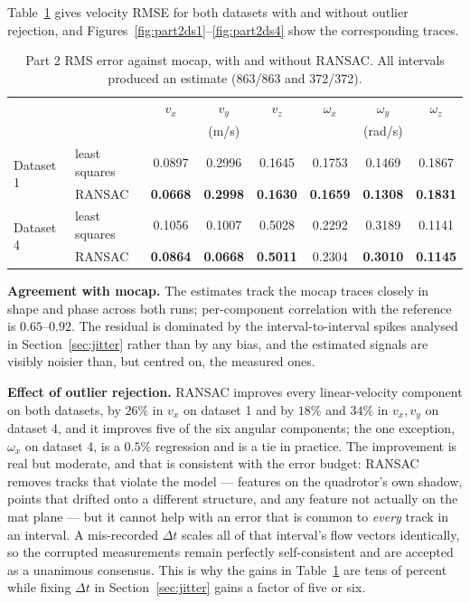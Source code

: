 \documentclass[10pt]{article}
\begin{document}
Table~\ref{tab:vel} gives velocity RMSE for both datasets with and without outlier rejection, and
Figures~\ref{fig:part2ds1}--\ref{fig:part2ds4} show the corresponding traces.

\begin{table}[htbp]
\centering\small
\caption{Part 2 RMS error against mocap, with and without RANSAC. All intervals produced an
estimate (863/863 and 372/372).}
\label{tab:vel}
\begin{tabular}{llcccccc}
\toprule
& & $v_x$ & $v_y$ & $v_z$ & $\omega_x$ & $\omega_y$ & $\omega_z$ \\
& & \multicolumn{3}{c}{(m/s)} & \multicolumn{3}{c}{(rad/s)} \\
\midrule
\multirow{2}{*}{Dataset 1} & least squares & 0.0897 & 0.2996 & 0.1645 & 0.1753 & 0.1469 & 0.1867 \\
 & RANSAC & \textbf{0.0668} & \textbf{0.2998} & \textbf{0.1630} & \textbf{0.1659} & \textbf{0.1308} & \textbf{0.1831} \\
\midrule
\multirow{2}{*}{Dataset 4} & least squares & 0.1056 & 0.1007 & 0.5028 & 0.2292 & 0.3189 & 0.1141 \\
 & RANSAC & \textbf{0.0864} & \textbf{0.0668} & \textbf{0.5011} & 0.2304 & \textbf{0.3010} & \textbf{0.1145} \\
\bottomrule
\end{tabular}
\end{table}

\textbf{Agreement with mocap.} The estimates track the mocap traces closely in shape and phase
across both runs; per-component correlation with the reference is $0.65$--$0.92$. The residual is
dominated by the interval-to-interval spikes analysed in Section~\ref{sec:jitter} rather than by any
bias, and the estimated signals are visibly noisier than, but centred on, the measured ones.

\textbf{Effect of outlier rejection.} RANSAC improves every linear-velocity component on both
datasets, by $26\%$ in $v_x$ on dataset 1 and by $18\%$ and $34\%$ in $v_x,v_y$ on dataset 4, and it
improves five of the six angular components; the one exception, $\omega_x$ on dataset 4, is a
$0.5\%$ regression and is a tie in practice. The improvement is real but moderate, and that is
consistent with the error budget: RANSAC removes tracks that violate the model --- features on the
quadrotor's own shadow, points that drifted onto a different structure, and any feature not actually
on the mat plane --- but it cannot help with an error that is common to \emph{every} track in an
interval. A mis-recorded $\Delta t$ scales all of that interval's flow vectors identically, so the
corrupted measurements remain perfectly self-consistent and are accepted as a unanimous consensus.
This is why the gains in Table~\ref{tab:vel} are tens of percent while fixing $\Delta t$ in
Section~\ref{sec:jitter} gains a factor of five or six.
\end{document}
